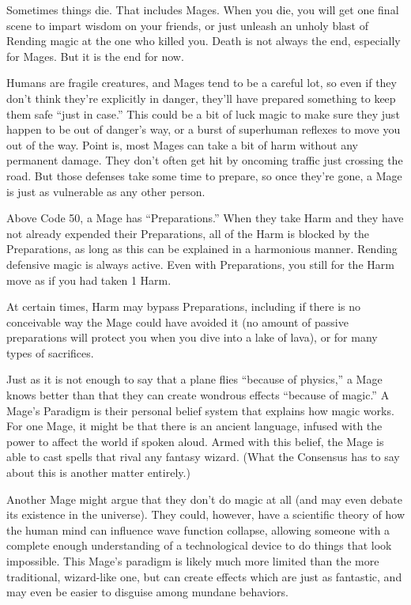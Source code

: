 \documentclass[letterpaper,12pt]{article}
\newcommand{\SECTION}[1]{\vspace{.5em}{\noindent\titlefont\large\textbf{#1}}

}
\begin{document}
\SECTION{Death}
Sometimes things die. That includes Mages. When you die, you will get
one final scene to impart wisdom on your friends, or just unleash an
unholy blast of Rending magic at the one who killed you. Death is not
always the end, especially for Mages. But it is the end for now.

\SECTION{Magical Preparations}
Humans are fragile creatures, and Mages tend to be a careful lot, so
even if they don't think they're explicitly in danger, they'll have
prepared something to keep them safe ``just in case.'' This could be a
bit of luck magic to make sure they just happen to be out of danger's
way, or a burst of superhuman reflexes to move you out of the
way. Point is, most Mages can take a bit of harm without any permanent
damage. They don't often get hit by oncoming traffic just crossing the
road. But those defenses take some time to prepare, so once they're
gone, a Mage is just as vulnerable as any other person.

Above Code 50, a Mage has ``Preparations.'' When they take Harm and
they have not already expended their Preparations, all of the Harm is
blocked by the Preparations, as long as this can be explained in a
harmonious manner. Rending defensive magic is always active. Even with
Preparations, you still for the Harm move as if you had taken 1 Harm.

At certain times, Harm may bypass Preparations, including if there is
no conceivable way the Mage could have avoided it (no amount of
passive preparations will protect you when you dive into a lake of
lava), or for many types of sacrifices.

\SECTION{Paradigm}
Just as it is not enough to say that a plane flies ``because of
physics,'' a Mage knows better than that they can create wondrous
effects ``because of magic.'' A Mage's Paradigm is their personal
belief system that explains how magic works. For one Mage, it might be
that there is an ancient language, infused with the power to affect
the world if spoken aloud. Armed with this belief, the Mage is able to
cast spells that rival any fantasy wizard. (What the Consensus has to
say about this is another matter entirely.)

Another Mage might argue that they don't do magic at all (and may even
debate its existence in the universe). They could, however, have a
scientific theory of how the human mind can influence wave function
collapse, allowing someone with a complete enough understanding of a
technological device to do things that look impossible. This Mage's
paradigm is likely much more limited than the more traditional,
wizard-like one, but can create effects which are just as fantastic,
and may even be easier to disguise among mundane behaviors.
\end{document}
